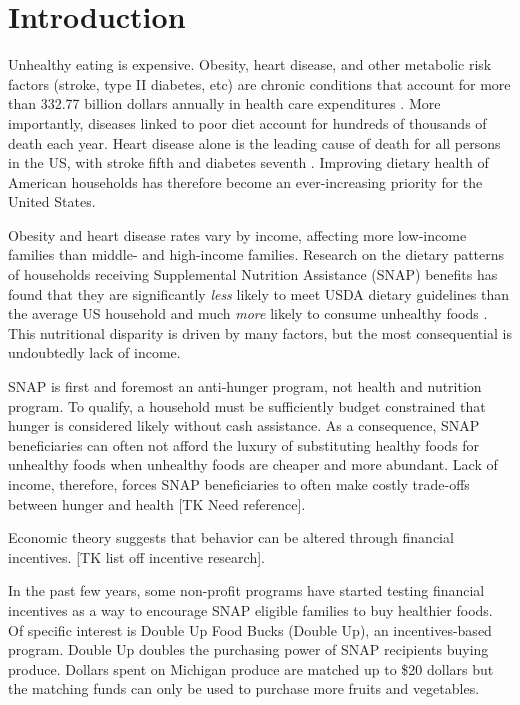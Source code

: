 \documentclass[11pt,letterpaperpaper,]{book}
\begin{document}
\section{Introduction}\label{introduction}

Unhealthy eating is expensive. Obesity, heart disease, and other
metabolic risk factors (stroke, type II diabetes, etc) are chronic
conditions that account for more than 332.77 billion dollars annually in
health care expenditures \citep{chatterjee_checkup_2014}. More
importantly, diseases linked to poor diet account for hundreds of
thousands of death each year. Heart disease alone is the leading cause
of death for all persons in the US, with stroke fifth and diabetes
seventh \citep{national_center_for_health_statistics_health_2015}.
Improving dietary health of American households has therefore become an
ever-increasing priority for the United States.

Obesity and heart disease rates vary by income, affecting more
low-income families than middle- and high-income families. Research on
the dietary patterns of households receiving Supplemental Nutrition
Assistance (SNAP) benefits has found that they are significantly
\emph{less} likely to meet USDA dietary guidelines than the average US
household and much \emph{more} likely to consume unhealthy foods
\citep{andreyeva_dietary_2015, nguyen_supplemental_2015, wolfson_fruit_2015}.
This nutritional disparity is driven by many factors, but the most
consequential is undoubtedly lack of income.

SNAP is first and foremost an anti-hunger program, not health and
nutrition program. To qualify, a household must be sufficiently budget
constrained that hunger is considered likely without cash assistance. As
a consequence, SNAP beneficiaries can often not afford the luxury of
substituting healthy foods for unhealthy foods when unhealthy foods are
cheaper and more abundant. Lack of income, therefore, forces SNAP
beneficiaries to often make costly trade-offs between hunger and health
{[}TK Need reference{]}.

Economic theory suggests that behavior can be altered through financial
incentives. {[}TK list off incentive research{]}.

In the past few years, some non-profit programs have started testing
financial incentives as a way to encourage SNAP eligible families to buy
healthier foods. Of specific interest is Double Up Food Bucks (Double
Up), an incentives-based program. Double Up doubles the purchasing power
of SNAP recipients buying produce. Dollars spent on Michigan produce are
matched up to \$20 dollars but the matching funds can only be used to
purchase more fruits and vegetables.
\end{document}
